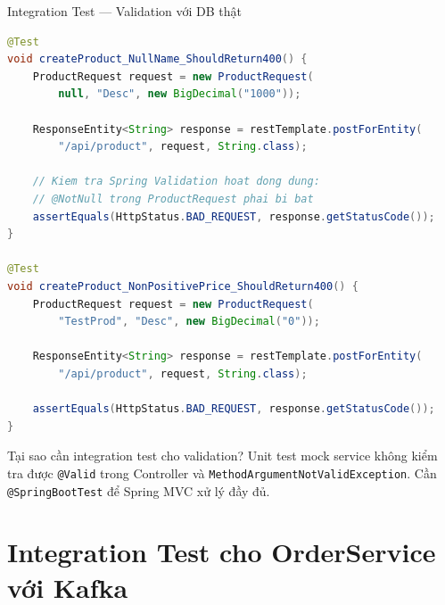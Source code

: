 \documentclass[aspectratio=169,10pt]{beamer}
\begin{document}
\begin{frame}[fragile]{Integration Test --- Validation với DB thật}
\begin{lstlisting}[language=Java]
@Test
void createProduct_NullName_ShouldReturn400() {
    ProductRequest request = new ProductRequest(
        null, "Desc", new BigDecimal("1000"));

    ResponseEntity<String> response = restTemplate.postForEntity(
        "/api/product", request, String.class);

    // Kiem tra Spring Validation hoat dong dung:
    // @NotNull trong ProductRequest phai bi bat
    assertEquals(HttpStatus.BAD_REQUEST, response.getStatusCode());
}

@Test
void createProduct_NonPositivePrice_ShouldReturn400() {
    ProductRequest request = new ProductRequest(
        "TestProd", "Desc", new BigDecimal("0"));

    ResponseEntity<String> response = restTemplate.postForEntity(
        "/api/product", request, String.class);

    assertEquals(HttpStatus.BAD_REQUEST, response.getStatusCode());
}
\end{lstlisting}

  \begin{exampleblock}{Tại sao cần integration test cho validation?}
    Unit test mock service không kiểm tra được
    \texttt{@Valid} trong Controller và \texttt{MethodArgumentNotValidException}.
    Cần \texttt{@SpringBootTest} để Spring MVC xử lý đầy đủ.
  \end{exampleblock}
\end{frame}

\section{Integration Test cho OrderService với Kafka}
\end{document}
